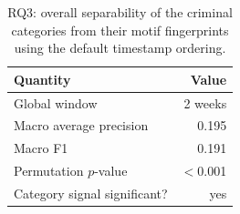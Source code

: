 \begin{table}[ht]
\centering
\caption{RQ3: overall separability of the criminal categories from their motif fingerprints using the default timestamp ordering.}
\label{tab:res_rq3_global}
\small
\begin{tabular}{@{}l r@{}}
\toprule
\textbf{Quantity} & \textbf{Value} \\
\midrule
Global window & 2 weeks \\
Macro average precision & 0.195 \\
Macro F1 & 0.191 \\
Permutation $p$-value & $<$0.001 \\
Category signal significant? & yes \\
\bottomrule
\end{tabular}
\end{table}
